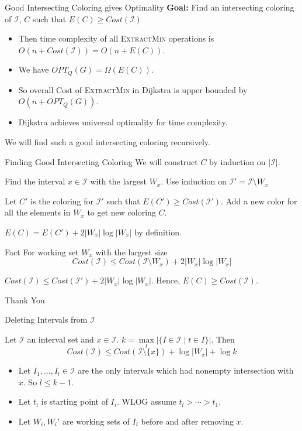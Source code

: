 \documentclass[10pt]{beamer}
\begin{document}
\begin{frame}{Good Intersecting Coloring gives Optimality}
	\textbf{Goal:} Find an intersecting coloring of $\mathcal{I}$, $C$ such that $E(C)\geq Cost(\mathcal{I})$\pause

	\begin{itemize}
		\item Then time complexity of all \textsc{ExtractMin} operations is $O(n+Cost(\mathcal{I}))=O(n+E(C))$.\pause
		\item We have  $OPT_Q(G)=\Omega (E(C))$.\pause
		\item So overall Cost of \textsc{ExtractMin} in Dijkstra is upper bounded by $O(n+OPT_Q(G))$.\pause
		\item Dijkstra achieves universal optimality for time complexity.\pause
	\end{itemize}
	\vfill

	We will find such a good intersecting coloring recursively.
\end{frame}
\begin{frame}{Finding Good Intersecting Coloring}
	We will construct $C$ by induction on $|\mathcal{I}|$.\pause \setlength{\parindent}{1cm}

	Find the interval $x\in\mathcal{I}$ with the largest $W_x$. Use induction on $\mathcal{I}'=\mathcal{I}\setminus W_x$\pause

	Let $C'$ is the coloring for $\mathcal{I}'$ such that $E(C')\geq Cost(\mathcal{I}')$. Add a new color for all the elements in $W_x$ to get new coloring $C$.\pause

	$E(C)=E(C')+2|W_x|\log|W_x|$ by definition. \pause

	\begin{alertblock}{Fact}
		For working set $W_x$ with the largest size $$Cost(\mathcal{I})\leq Cost(\mathcal{I}\setminus W_x)+2|W_x|\log |W_x|$$
	\end{alertblock}\pause

	$Cost(\mathcal{I})\leq Cost(\mathcal{I}')+2|W_x|\log|W_x|$. Hence, $E(C)\geq Cost(\mathcal{I})$.
\end{frame}
\begin{frame}[standout]
	Thank You
\end{frame}
\begin{frame}{Deleting Intervals from $\mathcal{I}$}
	\begin{theorem}
		Let $\mathcal{I}$ an interval set and $x\in\mathcal{I}$. $k=\max\limits_t|\{I\in\mathcal{I}\mid t\in I\}|$. Then $$Cost(\mathcal{I})\leq Cost(\mathcal{I}\setminus \{x\})+\log |W_x|+\log k$$
	\end{theorem}\vfill

	\begin{itemize}
		\item Let $I_1,\dots, I_l\in\mathcal{I}$ are the only intervals which had nonempty intersection with $x$. So $l\leq k-1$.\vfill
		\item Let $t_i$ is starting point of $I_i$. WLOG assume $t_l>\cdots>t_1$.\vfill
		\item Let $W_i, W_i'$ are working sets of $I_i$ before and after removing $x$.
	\end{itemize}
\end{frame}
\end{document}
